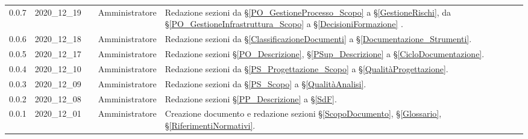 {\begin{longtable}{ c c  C{2.3cm} C{3cm} C{3.2cm}}
     0.0.7 & 2020\_12\_19 & \TG{}  & Amministratore & Redazione sezioni da \S\ref{PO_GestioneProcesso_Scopo} a \S\ref{GestioneRischi}, da \S\ref{PO_GestioneInfrastruttura_Scopo} a \S\ref{DecisioniFormazione} . \\
    
    0.0.6 & 2020\_12\_18 & \TG{}  & Amministratore & Redazione sezioni da \S\ref{ClassificazioneDocumenti} a \S\ref{Documentazione_Strumenti}. \\
    
    0.0.5 & 2020\_12\_17 & \TG{} & Amministratore  & Redazione sezioni \S\ref{PO_Descrizione}, \S\ref{PSup_Descrizione} a \S\ref{CicloDocumentazione}. \\
    
     0.0.4 & 2020\_12\_10 & \TG{} & Amministratore  & Redazione sezioni da \S\ref{PS_Progettazione_Scopo} a \S\ref{QualitàProgettazione}. \\
    
     0.0.3 & 2020\_12\_09 & \TG{} & Amministratore  & Redazione sezioni da \S\ref{PS_Scopo} a \S\ref{QualitàAnalisi}.  \\
     
     0.0.2 & 2020\_12\_08 & \TG{} & Amministratore  & Redazione sezioni \S\ref{PP_Descrizione} a \S\ref{SdF}.  \\      
            
    0.0.1 & 2020\_12\_01 & \TG{} & Amministratore  & Creazione documento e redazione sezioni \S\ref{ScopoDocumento}, \S\ref{Glossario}, \S\ref{RiferimentiNormativi}.  \\
			
\end{longtable}
}